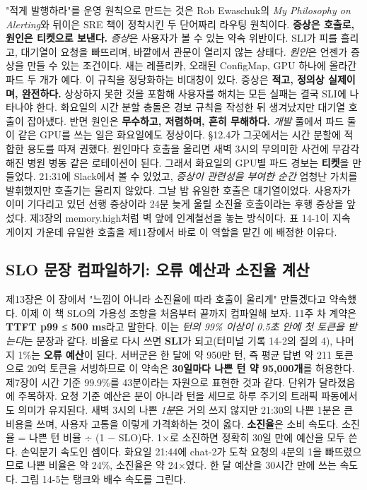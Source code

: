 "적게 발행하라"를 운영 원칙으로 만드는 것은 Rob Ewaschuk의 \textit{My Philosophy on Alerting}와 뒤이은 SRE 책이 정착시킨 두 단어짜리 라우팅 원칙이다. \textbf{증상은 호출로, 원인은 티켓으로 보낸다.} \textit{증상}은 사용자가 볼 수 있는 약속 위반이다. SLI가 피를 흘리고, 대기열이 요청을 빠뜨리며, 바깥에서 관문이 열리지 않는 상태다. \textit{원인}은 언젠가 증상을 만들 수 있는 조건이다. 새는 레플리카, 오래된 ConfigMap, GPU 하나에 올라간 파드 두 개가 예다. 이 규칙을 정당화하는 비대칭이 있다. 증상은 \textbf{적고, 정의상 실제이며, 완전하다.} 상상하지 못한 것을 포함해 사용자를 해치는 모든 실패는 결국 SLI에 나타나야 한다. 화요일의 시간 분할 충돌은 경보 규칙을 작성한 뒤 생겨났지만 대기열 호출이 잡아냈다. 반면 원인은 \textbf{무수하고, 저렴하며, 흔히 무해하다.} \textit{개발} 풀에서 파드 둘이 같은 GPU를 쓰는 일은 화요일에도 정상이다. §12.4가 그곳에서는 시간 분할에 적합한 용도를 따져 권했다. 원인마다 호출을 울리면 새벽 3시의 무의미한 사건에 무감각해진 병원 병동 같은 로테이션이 된다. 그래서 화요일의 GPU별 파드 경보는 \textbf{티켓}을 만들었다. 21:31에 Slack에서 볼 수 있었고, \textit{증상이 관련성을 부여한 순간} 엄청난 가치를 발휘했지만 호출기는 울리지 않았다. 그날 밤 유일한 호출은 대기열이었다. 사용자가 이미 기다리고 있던 선행 증상이라 24분 늦게 울릴 소진율 호출이라는 후행 증상을 앞섰다. 제3장의 memory.high처럼 벽 앞에 인계철선을 놓는 방식이다. 표 14-1이 지속 게이지 가운데 유일한 호출을 제11장에서 바로 이 역할을 맡긴 에 배정한 이유다.

\subsection*{SLO 문장 컴파일하기: 오류 예산과 소진율 계산}

제13장은 이 장에서 "느낌이 아니라 소진율에 따라 호출이 울리게" 만들겠다고 약속했다. 이제 이 책 SLO의 가용성 조항을 처음부터 끝까지 컴파일해 보자. 11주 차 계약은 \textbf{TTFT p99 ≤ 500 ms}라고 말한다. 이는 \textit{턴의 99\% 이상이 0.5초 안에 첫 토큰을 받는다}는 문장과 같다. 비율로 다시 쓰면 \textbf{SLI}가 되고(터미널 기록 14-2의 질의 4), 나머지 1\%는 \textbf{오류 예산}이 된다. 서버군은 한 달에 약 950만 턴, 즉 평균 답변 약 211 토큰으로 20억 토큰을 서빙하므로 이 약속은 \textbf{30일마다 나쁜 턴 약 95,000개}를 허용한다. 제7장이 시간 기준 99.9\%를 43분이라는 자원으로 표현한 것과 같다. 단위가 달라졌음에 주목하자. 요청 기준 예산은 분이 아니라 턴을 세므로 하루 주기의 트래픽 파동에서도 의미가 유지된다. 새벽 3시의 나쁜 \textit{1분}은 거의 쓰지 않지만 21:30의 나쁜 1분은 큰 비용을 쓰며, 사용자 고통을 이렇게 가격화하는 것이 옳다. \textbf{소진율}은 소비 속도다. 소진율 = 나쁜 턴 비율 ÷ (1 − SLO)다. 1×로 소진하면 정확히 30일 만에 예산을 모두 쓴다. 손익분기 속도인 셈이다. 화요일 21:44에 chat-2가 도착 요청의 4분의 1을 빠뜨렸으므로 나쁜 비율은 약 24\%, 소진율은 약 24×였다. 한 달 예산을 30시간 만에 쓰는 속도다. 그림 14-5는 탱크와 배수 속도를 그린다.

